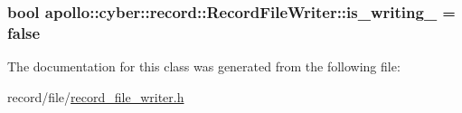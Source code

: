 \hypertarget{classapollo_1_1cyber_1_1record_1_1RecordFileWriter_a3594172acf9d83c7276cd387c4f62b7f}{
\subsubsection[{is\-\_\-writing\-\_\-}]{\setlength{\rightskip}{0pt plus 5cm}bool apollo\-::cyber\-::record\-::\-Record\-File\-Writer\-::is\-\_\-writing\-\_\- = false\hspace{0.3cm}{\ttfamily [private]}}}\label{classapollo_1_1cyber_1_1record_1_1RecordFileWriter_a3594172acf9d83c7276cd387c4f62b7f}


The documentation for this class was generated from the following file\-:\begin{DoxyCompactItemize}
\item 
record/file/\hyperlink{record__file__writer_8h}{record\-\_\-file\-\_\-writer.\-h}\end{DoxyCompactItemize}
